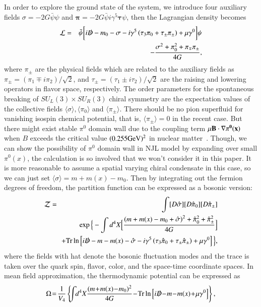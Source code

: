 \documentclass[aps,prd,amsmath,two column,amssymb,showpacs]{revtex4}
\begin{document}
In order to explore the ground state of the system, we introduce four auxiliary fields $\sigma=-2G\bar\psi\psi$ and ${\boldsymbol \pi}=-2G\bar\psi i\gamma^5{\boldsymbol \tau}\psi$, then the Lagrangian density becomes
\begin{eqnarray}
{\cal L} &=& \bar\psi\bigg[i{\slashed D}-m_0-\sigma-i\gamma^5\left(\tau_3\pi_0+\tau_\pm\pi_\pm\right)+{\mu}\gamma^0\bigg]\psi\nonumber\\
&&-{\sigma^2+\pi_0^2+\pi_\mp\pi_\pm\over 4G},
\end{eqnarray}
where $\pi_\pm$ are the physical fields which are related to the auxiliary fields as $\pi_\pm=\left(\pi_1\mp i\pi_2\right)/\sqrt 2$, and $\tau_\pm=\left(\tau_1\pm i\tau_2\right)/\sqrt 2$ are the raising and lowering operators in flavor space, respectively. The order parameters for the spontaneous breaking of $SU_L(3)\times SU_R(3)$ chiral symmetry are the expectation values of the collective fields $\langle\sigma\rangle, \langle\pi_0\rangle$ and $\langle\pi_\pm\rangle$. There should be no pion superfluid for vanishing isospin chemical potential, that is, $\langle\pi_\pm\rangle=0$ in the recent case. But there might exist stable $\pi^0$ domain wall due to the coupling term $\mu \bf{B\cdot\nabla}\pi^0(x)$ when $B$ exceeds the critical value $(0.255 {\rm GeV})^2$ in nuclear matter~\cite{Son:2007ny}. Though, we can show the possibility of $\pi^0$ domain wall in NJL model by expanding over small $\pi^0(x)$, the calculation is so involved that we won't consider it in this paper. It is more reasonable to assume a spatial varying chiral condensate in this case, so we can just set $\langle\sigma\rangle=m+m(x)-m_0$. Then by integrating out the fermion degrees of freedom, the partition function can be expressed as a bosonic version:
\begin{eqnarray}
{\cal Z} &=&\int[D\hat{\sigma}][D\hat{\pi}_0][D\hat{\pi}_\pm]\nonumber\\
 &&\!\!\exp\Big\{-\int d^4X\Big[ {\left(m+m(x)-m_0+\hat{\sigma}\right)^2+\hat{\pi}_0^2+\hat{\pi}_\pm^2\over 4G}\Big]\\
&&\!\!+\text {Tr}\ln\left[i{\slashed D}-m-m(x)-\hat{\sigma}-i\gamma^5\left(\tau_3\hat{\pi}_0+\tau_\pm\hat{\pi}_\pm\right)+{\mu}\gamma^0\right]\Big\},\nonumber
\end{eqnarray}
where the fields with hat denote the bosonic fluctuation modes and the trace is taken over the quark spin, flavor, color, and the space-time coordinate spaces. In mean field approximation, the thermodynamic potential can be expressed as
\begin{eqnarray}\label{Omega}
\Omega\!=\!{1\over V_4}\left\{\!\!\int\!\! d^4X{(m\!+\!m(x)\!-\!m_0)^2\over 4G}\!-\!\text {Tr}\ln\left[i{\slashed D}\!-\!m\!-\!m(x)\!+\!{\mu}\gamma^0\right]\right\},
\end{eqnarray}
\end{document}

